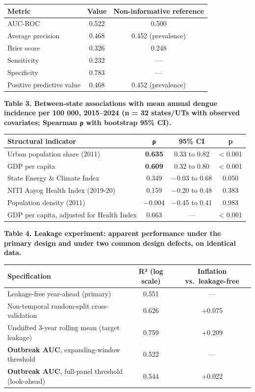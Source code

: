 \documentclass[
  10pt,
  twocolumn]{article}
\begin{document}
\begin{table}[t]\centering\footnotesize
\begin{tabular}{@{}
lcc@{}}
\toprule
Metric & Value & Non-informative reference \\
\midrule
AUC-ROC & 0.522 & 0.500 \\
Average precision & 0.468 & 0.452 (prevalence) \\
Brier score & 0.326 & 0.248 \\
Sensitivity & 0.232 & --- \\
Specificity & 0.783 & --- \\
Positive predictive value & 0.468 & 0.452 (prevalence) \\
\bottomrule
\end{tabular}\end{table}

\textbf{Table 3. Between-state associations with mean annual dengue
incidence per 100 000, 2015--2024 (n = 32 states/UTs with observed
covariates; Spearman ρ with bootstrap 95\% CI).}

\begin{table}[t]\centering\footnotesize
\begin{tabular}{@{}
lccc@{}}
\toprule
Structural indicator & ρ & 95\% CI & p \\
\midrule
Urban population share (2011) & \textbf{0.635} & 0.33 to 0.82 &
\textless{} 0.001 \\
GDP per capita & \textbf{0.609} & 0.32 to 0.80 & \textless{} 0.001 \\
State Energy \& Climate Index & 0.349 & −0.03 to 0.68 & 0.050 \\
NITI Aayog Health Index (2019-20) & 0.159 & −0.20 to 0.48 & 0.383 \\
Population density (2011) & −0.004 & −0.45 to 0.41 & 0.983 \\
GDP per capita, adjusted for Health Index & 0.663 & --- & \textless{}
0.001 \\
\bottomrule
\end{tabular}\end{table}

\textbf{Table 4. Leakage experiment: apparent performance under the
primary design and under two common design defects, on identical data.}

\begin{table}[t]\centering\footnotesize
\begin{tabular}{@{}
lcc@{}}
\toprule
Specification & R² (log scale) & Inflation vs.~leakage-free \\
\midrule
Leakage-free year-ahead (primary) & 0.551 & --- \\
Non-temporal random-split cross-validation & 0.626 & +0.075 \\
Unshifted 3-year rolling mean (target leakage) & 0.759 & +0.209 \\
\textbf{Outbreak AUC}, expanding-window threshold & 0.522 & --- \\
\textbf{Outbreak AUC}, full-panel threshold (look-ahead) & 0.544 &
+0.022 \\
\bottomrule
\end{tabular}\end{table}
\end{document}
